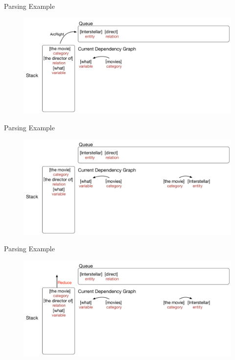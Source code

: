 \documentclass{beamer}
\begin{document}
\begin{frame}{Parsing Example}
	\begin{figure}
		\centering\includegraphics[width=1.0\textwidth]{introduction/parsing_examples/17.pdf}
	\end{figure}	
\end{frame}

\begin{frame}{Parsing Example}
	\begin{figure}
		\centering\includegraphics[width=1.0\textwidth]{introduction/parsing_examples/18.pdf}
	\end{figure}	
\end{frame}

\begin{frame}{Parsing Example}
	\begin{figure}
		\centering\includegraphics[width=1.0\textwidth]{introduction/parsing_examples/19.pdf}
	\end{figure}	
\end{frame}
\end{document}
